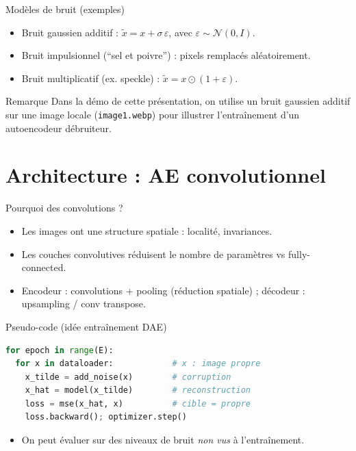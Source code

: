 \documentclass[11pt,aspectratio=169]{beamer}
\begin{document}
\begin{frame}{Modèles de bruit (exemples)}
\begin{itemize}
  \item Bruit gaussien additif : $\tilde{x} = x + \sigma\,\varepsilon$, avec $\varepsilon\sim\mathcal{N}(0,I)$.
  \item Bruit impulsionnel (``sel et poivre'') : pixels remplacés aléatoirement.
  \item Bruit multiplicatif (ex. speckle) : $\tilde{x}=x\odot(1+\varepsilon)$.
\end{itemize}

\begin{block}{Remarque}
Dans la démo de cette présentation, on utilise un bruit gaussien additif sur une image locale (\texttt{image1.webp}) pour illustrer l'entraînement d'un autoencodeur débruiteur.
\end{block}
\end{frame}

\section{Architecture : AE convolutionnel}

\begin{frame}{Pourquoi des convolutions ?}
\begin{itemize}
  \item Les images ont une structure spatiale : localité, invariances.
  \item Les couches convolutives réduisent le nombre de paramètres vs fully-connected.
  \item Encodeur : convolutions + pooling (réduction spatiale) ; décodeur : upsampling / conv transpose.
\end{itemize}
\end{frame}

\begin{frame}[fragile]{Pseudo-code (idée entraînement DAE)}
\begin{lstlisting}[language=Python]
for epoch in range(E):
  for x in dataloader:            # x : image propre
    x_tilde = add_noise(x)        # corruption
    x_hat = model(x_tilde)        # reconstruction
    loss = mse(x_hat, x)          # cible = propre
    loss.backward(); optimizer.step()
\end{lstlisting}

\begin{itemize}
  \item On peut évaluer sur des niveaux de bruit \emph{non vus} à l'entraînement.
\end{itemize}
\end{frame}
\end{document}
